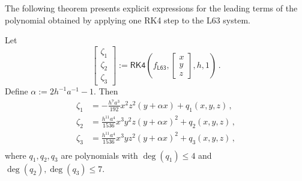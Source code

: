 \documentclass{article}
\newcommand{\lb}{\left(} %
\newcommand{\rb}{\right)} %
\newcommand{\br}[1]{\lb #1 \rb} %
\newcommand{\brOf}[1]{\!\br{#1}} %
\newcommand{\eqcm}{\,,} %
\newcommand{\eqfs}{\,.}
\begin{document}
The following theorem presents explicit expressions for the leading terms of the polynomial obtained by applying one RK4 step to the L63 system.
%
\begin{theorem}\label{thm:rk4l63:one}
	Let
	\begin{equation*}
		\begin{bmatrix}
			\zeta_{1}\\
			\zeta_{2}\\
			\zeta_{3}
		\end{bmatrix}
		:=
		\mathsf{RK4}\brOf{f_{\mathsf{L63}}, \begin{bmatrix}
				x\\
				y\\
				z
			\end{bmatrix}, h, 1}
		\eqfs
	\end{equation*}
	Define $\alpha := 2h^{-1}a^{-1} - 1$.
	Then
	\begin{align*}
		\zeta_{1} &= -\frac{h^7a^3}{192}x^2z^2(y+\alpha x) + q_1(x,y,z)\eqcm\\
		\zeta_{2} &= \frac{h^{11}a^4}{1536}x^3y^2z(y+\alpha x)^2 + q_2(x,y,z)\eqcm\\
		\zeta_{3} &= \frac{h^{11}a^4}{1536}x^3yz^2(y+\alpha x)^2 + q_3(x,y,z)\eqcm\\
	\end{align*}
	where $q_1, q_2, q_3$ are polynomials with $\deg(q_1) \leq 4$ and $\deg(q_2), \deg(q_3) \leq 7$.
\end{theorem}
%
\end{document}
